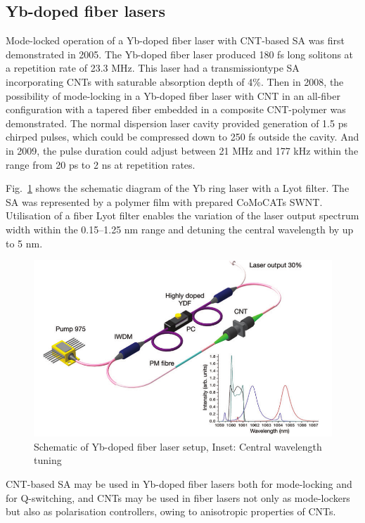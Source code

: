 \documentclass{phyasgn}\usepackage{nag}
\newcommand{\figref}[1]{Fig.~\ref{#1}}
\begin{document}
\subsection{Yb-doped fiber lasers}
Mode-locked operation of a Yb-doped fiber laser with CNT-based SA was first demonstrated in 2005\cite{goh2005femtosecond}. The Yb-doped fiber laser produced 180 fs long solitons at a repetition rate of 23.3 MHz. This laser had a transmissiontype SA incorporating CNTs with saturable absorption depth of 4\%. Then in 2008, the possibility of mode-locking in a Yb-doped fiber laser with CNT in an all-fiber configuration with a tapered fiber embedded in a composite CNT-polymer was demonstrated\cite{kieu2008all}. The normal dispersion laser cavity provided generation of 1.5 ps chirped pulses, which could be compressed down to 250 fs outside the cavity\cite{kieu2008all}. And in 2009, the pulse duration could adjust between 21 MHz and 177 kHz within the range from 20 ps to 2 ns at repetition rates\cite{kelleher2009nanosecond}. 
\par \figref{12} shows the schematic diagram of the Yb ring laser with a Lyot filter. The SA was represented by a polymer film with prepared CoMoCATs SWNT. Utilisation of a fiber Lyot filter enables the variation of the laser output spectrum width within the 0.15–1.25 nm range and detuning the central wavelength by up to 5 nm\cite{fedotov2012spectrum}.
\begin{figure}[!h]
	\centering
	\includegraphics[width=.95\linewidth]{pic/12.png}
	\caption[Band structures]{Schematic of Yb-doped fiber laser setup, Inset: Central wavelength tuning\cite{fedotov2012spectrum}}
	\label{12}
	\end{figure}
\par CNT-based SA may be used in Yb-doped fiber lasers both for mode-locking and for Q-switching, and CNTs may be used in fiber lasers not only as mode-lockers but also as polarisation controllers, owing to anisotropic properties of CNTs.
\end{document}
